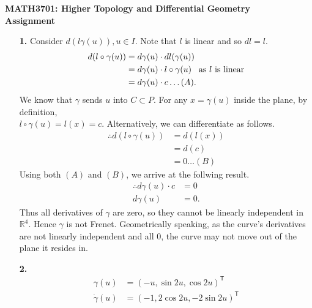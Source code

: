 \documentclass[a4paper]{article}
\newcommand{\ds}{\displaystyle}
\begin{document}
\hfill
{}
\begin{center}
  \vspace{-3mm}
	\textbf{\large {MATH3701: Higher Topology and Differential Geometry \\
	Assignment}}
\end{center}
\vspace{-5mm}
\hfill
{}

\begin{enumerate}[leftmargin=*]
\item[\textbf{1.}]
	Consider $\ds{d(l \gamma(u)), u \in I}$. Note that $\ds{l}$ is linear and so $\ds{dl = l}$.
	\begin{align*}
		d(l \circ \gamma(u)) & = d\gamma(u) \cdot dl(\gamma(u)) \\
							 & = d\gamma(u) \cdot l \circ \gamma(u) \hspace{3mm} \text{as $l$ is linear} \\
							 & = d\gamma(u) \cdot c \dots (A).
	\end{align*}
	We know that $\ds{\gamma}$ sends $\ds{u}$ into $\ds{C \subset P}$. For any $\ds{x = \gamma(u)}$ inside the plane, by definition, \\$\ds{l \circ \gamma(u) =l(x) = c}$. Alternatively, we can differentiate as follows.
	\begin{align*}
		\therefore d(l \circ \gamma(u)) & = d(l(x)) \\
										& = d(c) \\
										& = 0 \dots (B)
	\end{align*}
	Using both $\ds{(A)}$ and $\ds{(B)}$, we arrive at the follwing result.
	\begin{align*}
		\therefore d\gamma(u) \cdot c & = 0 \\
		d\gamma(u) & = 0.
	\end{align*}
	Thus all derivatives of $\ds{\gamma}$ are zero, so they cannot be linearly independent in $\ds{\mathbb{R}^4}$. Hence $\ds{\gamma}$ is not Frenet. Geometrically speaking, as the curve's derivatives are not linearly independent and all $\ds{0}$, the curve may not move out of the plane it resides in.
\item[\textbf{2.}]
	\begin{align*}
		\gamma(u) & = (-u,\sin{2u}, \cos{2u})^\mathsf{T} \\
		\dot{\gamma}(u) & = (-1, 2\cos{2u}, -2\sin{2u})^\mathsf{T} \\

\end{align*}
\end{enumerate}
\end{document}
